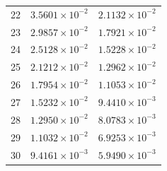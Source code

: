 \begin{table}[H]
\begin{tabular}{@{}rrr@{}}
22 & $3.5601\times10^{-2}$ & $2.1132\times10^{-2}$\\
23 & $2.9857\times10^{-2}$ & $1.7921\times10^{-2}$\\
24 & $2.5128\times10^{-2}$ & $1.5228\times10^{-2}$\\
25 & $2.1212\times10^{-2}$ & $1.2962\times10^{-2}$\\
26 & $1.7954\times10^{-2}$ & $1.1053\times10^{-2}$\\
27 & $1.5232\times10^{-2}$ & $9.4410\times10^{-3}$\\
28 & $1.2950\times10^{-2}$ & $8.0783\times10^{-3}$\\
29 & $1.1032\times10^{-2}$ & $6.9253\times10^{-3}$\\
30 & $9.4161\times10^{-3}$ & $5.9490\times10^{-3}$\\
\bottomrule
\end{tabular}
\end{table}

